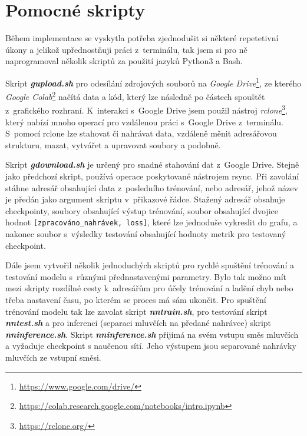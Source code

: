%
%


\section{Pomocné skripty}
Během implementace se vyskytla potřeba zjednodušit si některé repetetivní úkony a jelikož upřednostňuji práci z~terminálu, tak jsem si pro ně naprogramoval několik skriptů za použití jazyků Python3 a Bash. 

Skript \textbf{\textit{gupload.sh}} pro odesílání zdrojových souborů na \textit{Google Drive}\footnote{\url{https://www.google.com/drive/}}, ze kterého \textit{Google Colab}\footnote{\url{https://colab.research.google.com/notebooks/intro.ipynb}} načítá data a kód, který lze následně po částech spouštět z~grafického rozhraní. K~interakci s~Google Drive jsem použil nástroj \textit{rclone}\footnote{\url{https://rclone.org/}}, který nabízí mnoho operací pro vzdálenou práci s~Google Drive z~terminálu. S~pomocí rclone lze stahovat či nahrávat data, vzdáleně měnit adresářovou strukturu, mazat, vytvářet a upravovat soubory a podobně. 

Skript \textbf{\textit{gdownload.sh}} je určený pro snadné stahování dat z~Google Drive. Stejně jako předchozí skript, používá operace poskytované nástrojem rsync. Při zavolání stáhne adresář obsahující data z~posledního trénování, nebo adresář, jehož název je předán jako argument skriptu v~přikazové řádce.   
Stažený adresář obsahuje checkpointy, soubory obsahující výstup trénování, soubor obsahující dvojice hodnot \texttt{[zpracováno\_nahrávek, loss]}, které lze jednoduše vykreslit do grafu, a nakonec soubor s~výsledky testování obsahující hodnoty metrik pro testovaný checkpoint.

Dále jsem vytvořil několik jednoduchých skriptů pro rychlé spuštění trénování a testování modelu s~různými přednastavenými parametry. Bylo tak možno mít mezi skripty rozdílné cesty k~adresářům pro účely trénování a ladění chyb nebo třeba nastavení času, po kterém se proces má sám ukončit. Pro spuštění trénování modelu tak lze zavolat skript \textbf{\textit{nntrain.sh}}, pro testování skript \textbf{\textit{nntest.sh}} a pro inferenci (separaci mluvčích na předané nahrávce) skript \textbf{\textit{nninference.sh}}. Skript \textbf{\textit{nninference.sh}} přijímá na svém vstupu směs mluvčích a vyžaduje checkpoint s naučenou sítí. Jeho výstupem jsou separované nahrávky mluvčích ze vstupní směsi.


